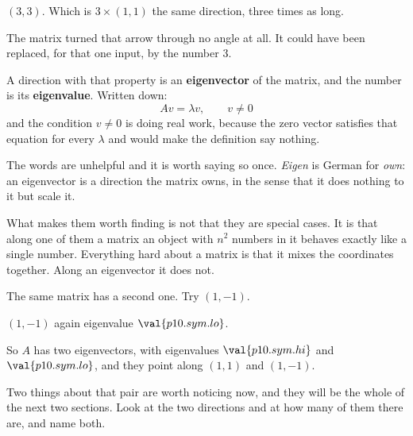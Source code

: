 \begin{fr}
\begin{ansblock}
$(3, 3)$. Which is $3 \times (1, 1)$ \dash{} the same direction, three times as
long.
\end{ansblock}

The matrix turned that arrow through no angle at all. It could have been
replaced, for that one input, by the number $3$.

A direction with that property is an \textbf{eigenvector} of the matrix, and
the number is its \textbf{eigenvalue}. Written down:
\[ Av = \lambda v, \qquad v \ne 0 \]
and the condition $v \ne 0$ is doing real work, because the zero vector
satisfies that equation for every $\lambda$ and would make the definition say
nothing.
\end{fr}

\begin{fr}
The words are unhelpful and it is worth saying so once. \emph{Eigen} is German
for \emph{own}: an eigenvector is a direction the matrix owns, in the sense
that it does nothing to it but scale it.

What makes them worth finding is not that they are special cases. It is that
along one of them a matrix \dash{} an object with $n^{2}$ numbers in it \dash{}
behaves exactly like a single number. Everything hard about a matrix is that it
mixes the coordinates together. Along an eigenvector it does not.
\end{fr}


\begin{fr}
The same matrix has a second one. Try $(1, -1)$.
\dotline
\nextframe
\end{fr}

\begin{fr}
\begin{ansblock}
$(1, -1)$ again \dash{} eigenvalue $\val{p10.sym.lo}$.
\end{ansblock}

So $A$ has two eigenvectors, with eigenvalues $\val{p10.sym.hi}$ and
$\val{p10.sym.lo}$, and they point along $(1,1)$ and $(1,-1)$.

Two things about that pair are worth noticing now, and they will be the whole
of the next two sections. Look at the two directions and at how many of them
there are, and name both.
\dotline
\nextframe
\end{fr}

